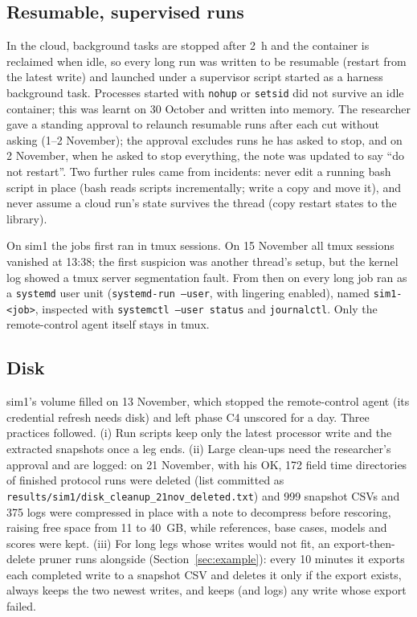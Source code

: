 \documentclass[preprint,review,12pt]{elsarticle}
\begin{document}
\subsection{Resumable, supervised runs}
In the cloud, background tasks are stopped after 2~h and the container is reclaimed when idle, so every long run was
written to be resumable (restart from the latest write) and launched under a supervisor script started as a harness
background task. Processes started with \texttt{nohup} or \texttt{setsid} did not survive an idle container; this was
learnt on 30 October and written into memory. The researcher gave a standing approval to relaunch resumable runs after
each cut without asking (1--2 November); the approval excludes runs he has asked to stop, and on 2 November, when he
asked to stop everything, the note was updated to say ``do not restart''. Two further rules came from incidents: never
edit a running bash script in place (bash reads scripts incrementally; write a copy and move it), and never assume a
cloud run's state survives the thread (copy restart states to the library).

On sim1 the jobs first ran in tmux sessions. On 15 November all tmux sessions vanished at 13:38; the first suspicion was
another thread's setup, but the kernel log showed a tmux server segmentation fault. From then on every long job ran as a
\texttt{systemd} user unit (\texttt{systemd-run --user}, with lingering enabled), named \texttt{sim1-<job>}, inspected
with \texttt{systemctl --user status} and \texttt{journalctl}. Only the remote-control agent itself stays in tmux.

\subsection{Disk}
sim1's volume filled on 13 November, which stopped the remote-control agent (its credential refresh needs disk)
and left phase C4 unscored for a day. Three practices followed. (i) Run scripts keep only the latest processor write
and the extracted snapshots once a leg ends. (ii) Large clean-ups need the researcher's approval and are logged: on 21
November, with his OK, 172 field time directories of finished protocol runs were deleted (list committed as
\texttt{results/sim1/disk\_cleanup\_21nov\_deleted.txt}) and 999 snapshot CSVs and 375 logs were compressed in place with
a note to decompress before rescoring, raising free space from 11 to 40~GB, while references, base cases, models and
scores were kept. (iii) For long legs whose writes would not fit, an export-then-delete pruner runs alongside
(Section~\ref{sec:example}): every 10 minutes it exports each completed write to a snapshot CSV and deletes it only if
the export exists, always keeps the two newest writes, and keeps (and logs) any write whose export failed.
\end{document}
